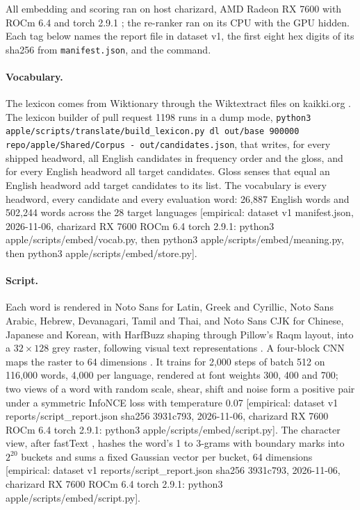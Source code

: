 \documentclass[11pt]{article}
\newcommand{\tg}[1]{\textcolor{bucketgray}{\footnotesize #1}}
\begin{document}
All embedding and scoring ran on host charizard, AMD Radeon RX 7600 with ROCm 6.4 and torch 2.9.1 \cite{paszke2019pytorch}; the re-ranker ran on its CPU with the GPU hidden. Each tag below names the report file in dataset v1, the first eight hex digits of its sha256 from \texttt{manifest.json}, and the command.

\paragraph{Vocabulary.} The lexicon comes from Wiktionary through the Wiktextract files on kaikki.org \cite{ylonen2022wiktextract,meyer2012wiktionary}. The lexicon builder of pull request 1198 runs in a dump mode, \texttt{python3 apple/scripts/translate/build\_lexicon.py dl out/base 900000 repo/apple/Shared/Corpus - out/candidates.json}, that writes, for every shipped headword, all English candidates in frequency order and the gloss, and for every English headword all target candidates. Gloss senses that equal an English headword add target candidates to its list. The vocabulary is every headword, every candidate and every evaluation word: 26,887 English words and 502,244 words across the 28 target languages \tg{[empirical: dataset v1 manifest.json, 2026-11-06, charizard RX 7600 ROCm 6.4 torch 2.9.1: python3 apple/scripts/embed/vocab.py, then python3 apple/scripts/embed/meaning.py, then python3 apple/scripts/embed/store.py]}.

\paragraph{Script.} Each word is rendered in Noto Sans for Latin, Greek and Cyrillic, Noto Sans Arabic, Hebrew, Devanagari, Tamil and Thai, and Noto Sans CJK for Chinese, Japanese and Korean, with HarfBuzz shaping through Pillow's Raqm layout, into a $32\times128$ grey raster, following visual text representations \cite{salesky2021visrep,rust2022pixel}. A four-block CNN maps the raster to 64 dimensions \cite{liu2017visual}. It trains for 2,000 steps of batch 512 on 116,000 words, 4,000 per language, rendered at font weights 300, 400 and 700; two views of a word with random scale, shear, shift and noise form a positive pair under a symmetric InfoNCE loss \cite{oord2018cpc,chen2020simclr} with temperature 0.07 \tg{[empirical: dataset v1 reports/script\_report.json sha256 3931c793, 2026-11-06, charizard RX 7600 ROCm 6.4 torch 2.9.1: python3 apple/scripts/embed/script.py]}. The character view, after fastText \cite{bojanowski2016fasttext}, hashes the word's 1 to 3-grams with boundary marks into $2^{20}$ buckets and sums a fixed Gaussian vector per bucket, 64 dimensions \tg{[empirical: dataset v1 reports/script\_report.json sha256 3931c793, 2026-11-06, charizard RX 7600 ROCm 6.4 torch 2.9.1: python3 apple/scripts/embed/script.py]}.
\end{document}

